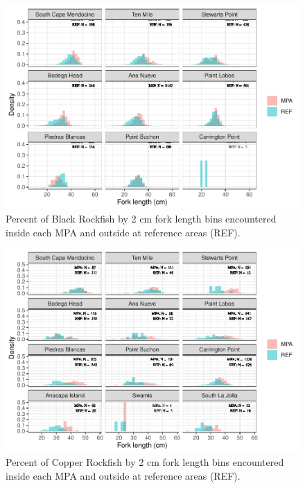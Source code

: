 \documentclass[
]{article}
\begin{document}
\FloatBarrier

\begin{figure}
\centering
\includegraphics{CCRFP_available_data_for_assessments_files/figure-latex/fig-lengths-1.pdf}
\caption{\label{fig:fig-lengths-1}Percent of Black Rockfish by 2 cm fork length bins encountered inside each MPA and outside at reference areas (REF).}
\end{figure}

\begin{figure}
\centering
\includegraphics{CCRFP_available_data_for_assessments_files/figure-latex/fig-lengths-2.pdf}
\caption{\label{fig:fig-lengths-2}Percent of Copper Rockfish by 2 cm fork length bins encountered inside each MPA and outside at reference areas (REF).}
\end{figure}
\end{document}

